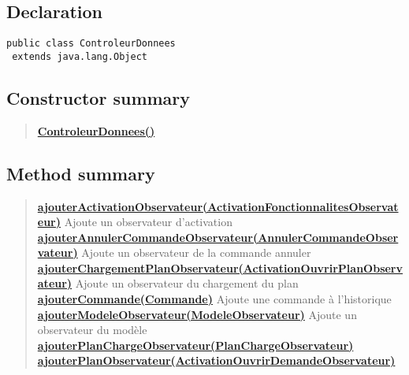 \documentclass[11pt,a4paper]{report}
\begin{document}
{{{{\subsection{Declaration}{
\begin{lstlisting}[frame=none]
public class ControleurDonnees
 extends java.lang.Object\end{lstlisting}
\subsection{Constructor summary}{
\begin{verse}
\hyperlink{controleur.ControleurDonnees()}{{\bf ControleurDonnees()}} \\
\end{verse}
}
\subsection{Method summary}{
\begin{verse}
\hyperlink{controleur.ControleurDonnees.ajouterActivationObservateur(controleur.observateur.ActivationFonctionnalitesObservateur)}{{\bf ajouterActivationObservateur(ActivationFonctionnalitesObservateur)}} Ajoute un observateur d'activation\\
\hyperlink{controleur.ControleurDonnees.ajouterAnnulerCommandeObservateur(controleur.observateur.AnnulerCommandeObservateur)}{{\bf ajouterAnnulerCommandeObservateur(AnnulerCommandeObservateur)}} Ajoute un observateur de la commande annuler\\
\hyperlink{controleur.ControleurDonnees.ajouterChargementPlanObservateur(controleur.observateur.ActivationOuvrirPlanObservateur)}{{\bf ajouterChargementPlanObservateur(ActivationOuvrirPlanObservateur)}} Ajoute un observateur du chargement du plan\\
\hyperlink{controleur.ControleurDonnees.ajouterCommande(controleur.commande.Commande)}{{\bf ajouterCommande(Commande)}} Ajoute une commande à l'historique\\
\hyperlink{controleur.ControleurDonnees.ajouterModeleObservateur(controleur.observateur.ModeleObservateur)}{{\bf ajouterModeleObservateur(ModeleObservateur)}} Ajoute un observateur du modèle\\
\hyperlink{controleur.ControleurDonnees.ajouterPlanChargeObservateur(controleur.observateur.PlanChargeObservateur)}{{\bf ajouterPlanChargeObservateur(PlanChargeObservateur)}} \\
\hyperlink{controleur.ControleurDonnees.ajouterPlanObservateur(controleur.observateur.ActivationOuvrirDemandeObservateur)}{{\bf ajouterPlanObservateur(ActivationOuvrirDemandeObservateur)}} \\

\end{verse}}}}}}}
\end{document}
